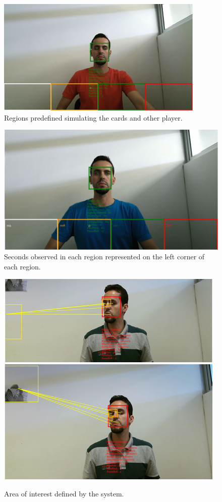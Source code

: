 \documentclass[10pt, conference]{IEEEtran}
\begin{document}
\begin{figure}[t]
	\centering
	\includegraphics{figures/pic7.png}
    \caption{Regions predefined simulating the cards and other player.}
    \label{fig:fig6}
\end{figure}

\begin{figure}[t]
	\centering
	\includegraphics{figures/pic8.png}
    \caption{Seconds observed in each region represented on the left corner of each region.}
    \label{fig:fig7}
\end{figure}

\begin{figure}[t]
	\centering
	\includegraphics{figures/pic9a.png}\\
    \includegraphics{figures/pic9b.png}\\    
    \caption{Area of interest defined by the system.}
    \label{fig:fig8}
\end{figure}
\end{document}
